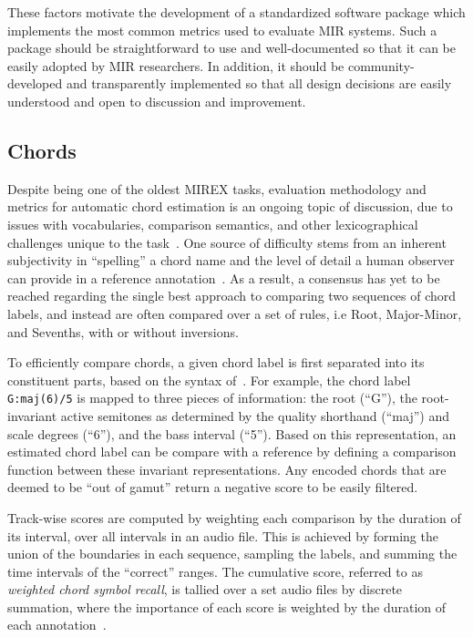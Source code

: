These factors motivate the development of a standardized software package which implements the most common metrics used to evaluate MIR systems.
Such a package should be straightforward to use and well-documented so that it can be easily adopted by MIR researchers.
In addition, it should be community-developed and transparently implemented so that all design decisions are easily understood and open to discussion and improvement.

\subsection{Chords}

Despite being one of the oldest MIREX tasks, evaluation methodology and metrics for automatic chord estimation is an ongoing topic of discussion, due to issues with vocabularies, comparison semantics, and other lexicographical challenges unique to the task~\cite{pauwels2013evaluating}.
One source of difficulty stems from an inherent subjectivity in ``spelling'' a chord name and the level of detail a human observer can provide in a reference annotation~\cite{ni2013understanding}.
As a result, a consensus has yet to be reached regarding the single best approach to comparing two sequences of chord labels, and instead are often compared over a set of rules, i.e Root, Major-Minor, and Sevenths, with or without inversions.

To efficiently compare chords, a given chord label is first separated into its
constituent parts, based on the syntax of~\cite{harte2010towards}.
For example, the chord label \texttt{G:maj(6)/5} is mapped to three pieces of information: the root (``G''), the root-invariant active semitones as determined by the quality shorthand (``maj'') and scale degrees (``6''), and the bass interval (``5'').
Based on this representation, an estimated chord label can be compare with a reference by defining a comparison function between these invariant representations.
Any encoded chords that are deemed to be ``out of gamut'' return a negative score to be easily filtered.

Track-wise scores are computed by weighting each comparison by the duration of its interval, over all intervals in an audio file.
This is achieved by forming the union of the boundaries in each sequence, sampling the labels, and summing the time intervals of the ``correct'' ranges.
The cumulative score, referred to as \emph{weighted chord symbol recall}, is tallied over a set audio files by discrete summation, where the importance of each score is weighted by the duration of each annotation~\cite{cho2013mirex}.


